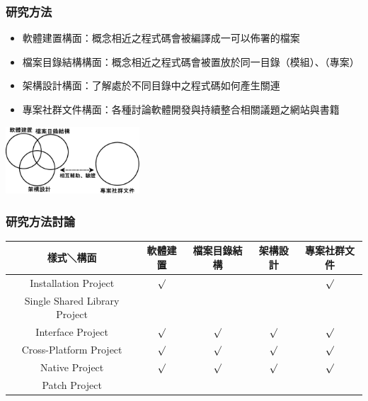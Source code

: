\documentclass[utf8x]{beamer}
\begin{document}
 \begin{frame}%
 \frametitle{研究方法}
 \begin{itemize}
 \setlength{\itemindent}{1em}
 \item[] 軟體建置構面：概念相近之程式碼會被編譯成一可以佈署的檔案
 \item[] 檔案目錄結構構面：概念相近之程式碼會被置放於同一目錄（模組）、（專案）
 \item[] 架構設計構面：了解處於不同目錄中之程式碼如何產生關連
 \item[] 專案社群文件構面：各種討論軟體開發與持續整合相關議題之網站與書籍
 \end{itemize}
 \begin{center}
 \includegraphics[width=5cm]{observation_view.eps}
 \end{center}
 \end{frame}

\begin{frame}
\frametitle{研究方法討論}
\begin{table}[!htbp]
\fontsize{9pt}{10pt}\selectfont
	\setlength{\abovecaptionskip}{0pt}
	\setlength{\belowcaptionskip}{10pt}
	\begin{center}
\begin{tabular}[width=\textwidth]{|c|c|c|c|c|}
\hline
樣式＼構面&軟體建置&檔案目錄結構&架構設計&專案社群文件\\
\hline
Installation Project&${\surd}$&&&${\surd}$\\
\hline
Single Shared Library Project&&&&\\
\hline
Interface Project&${\surd}$&${\surd}$&${\surd}$&${\surd}$\\
\hline
Cross-Platform Project&${\surd}$&${\surd}$&${\surd}$&${\surd}$\\
\hline
Native Project&${\surd}$&${\surd}$&${\surd}$&${\surd}$\\
\hline
Patch Project&&&&\\
\hline
\end{tabular}
\end{center}
\end{table}
\end{frame}
\end{document}
